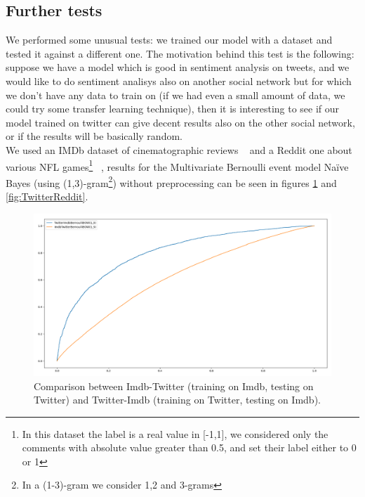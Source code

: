 \documentclass{article}
\begin{document}
    \subsection*{Further tests}
    We performed some unusual tests: we trained our model with a dataset and tested it against a different one. The motivation behind this test is the following: suppose we have a model which is good in sentiment analysis on tweets, and we would like to do sentiment analisys also on another social network but for which we don't have any data to train on (if we had even a small amount of data, we could try some transfer learning technique), then it is interesting to see if our model trained on twitter can give decent results also on the other social network, or if the results will be basically random.\\
    We used an IMDb dataset of cinematographic reviews ~\cite{data:imdb} and a Reddit one about various NFL games\footnote{In this dataset the label is a real value in [-1,1], we considered only the comments with absolute value greater than 0.5, and set their label either to 0 or 1} ~\cite{data:reddit}, results for the Multivariate Bernoulli event model Na\"ive Bayes (using (1,3)-gram\footnote{In a (1-3)-gram we consider 1,2 and 3-grams}) without preprocessing can be seen in figures \ref{fig:TwitterImdb} and \ref{fig:TwitterReddit}.
    
    \begin{figure}[h!t]
        \centering
        \includegraphics[scale=0.3]{../experiments/plots/ImdbTwitter}
        \caption{Comparison between Imdb-Twitter (training on Imdb, testing on Twitter) and Twitter-Imdb (training on Twitter, testing on Imdb).}
        \label{fig:TwitterImdb}        
    \end{figure}
    
\end{document}
